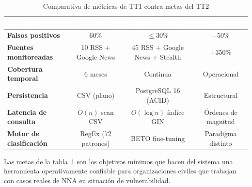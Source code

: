 \vspace{0.5cm}
\begin{table}[htbp]
\centering
\caption{Comparativa de métricas de TT1 contra metas del TT2}
\label{tab:baseline_tt2_meta}
\renewcommand{\arraystretch}{1.4}
\begin{tabular}{|p{4.5cm}|c|c|c|}
\hline
\rowcolor{black}
\textcolor{white}{\textbf{Métrica}} &
\textcolor{white}{\textbf{TT1 (P2)}} &
\textcolor{white}{\textbf{Meta TT2 (P4)}} &
\textcolor{white}{\textbf{Mejora}} \\
\hline
\textbf{Falsos positivos} & 60\% & $\leq 30\%$ & $-50\%$ \\
\hline
\textbf{Fuentes monitoreadas} & 10 RSS + Google News & 45 RSS + Google News + Stealth & $+350\%$ \\
\hline
\textbf{Cobertura temporal} & 6 meses & Continua & Operacional \\
\hline
\textbf{Persistencia} & CSV (plano) & PostgreSQL 16 (ACID) & Estructural \\
\hline
\textbf{Latencia de consulta} & $O(n)$ scan CSV & $O(\log n)$ índice GIN & Órdenes de magnitud \\
\hline
\textbf{Motor de clasificación} & RegEx (72 patrones) & BETO fine-tuning & Paradigma distinto \\
\hline
\end{tabular}
\end{table}

Las metas de la tabla~\ref{tab:baseline_tt2_meta} son los objetivos mínimos que hacen del sistema una herramienta
operativamente confiable para organizaciones civiles que trabajan con casos reales de NNA en
situación de vulnerabilidad.

